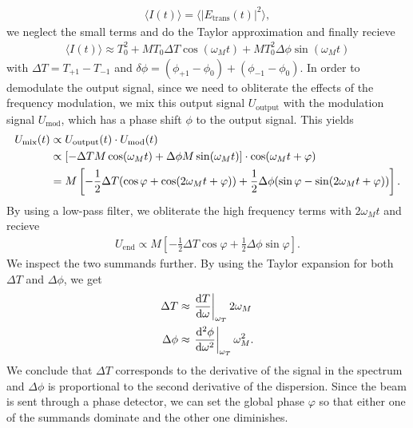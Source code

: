 \begin{align}
\langle I(t)\rangle=\langle|E_\text{trans}(t)|^2\rangle,
\end{align}
we neglect the small terms and do the Taylor approximation and finally recieve
\begin{align}
\langle I(t)\rangle\approx T_0^2+MT_0\Delta T\cos(\omega_M t)+MT_0^2\Delta\phi\sin(\omega_M t)
\end{align}
with $\Delta T=T_{+1}-T_{-1}$ and $\delta\phi=(\phi_{+1}-\phi_0)+(\phi_{-1}-\phi_0)$.
In order to demodulate the output signal, since we need to obliterate the effects of the frequency modulation, we mix this output signal $U_\text{output}$ with the modulation signal $U_\text{mod}$, which has a phase shift $\phi$ to the output signal. This yields
\begin{align}
U_\text{mix}(t)&\propto U_\text{output}(t)\cdot U_\text{mod}(t)\notag\\
&\propto\left[-\Delta TM\cos(\omega_M t)+\Delta \phi M\sin(\omega_M t)\right]\cdot \cos(\omega_M t+\varphi)\notag\\
&=M\left[-\frac{1}{2}\Delta T(\cos\varphi+\cos(2\omega_M t+\varphi))+\frac{1}{2}\Delta\phi(\sin\varphi-\sin(2\omega_M t+\varphi))\right].
\end{align}
By using a low-pass filter, we obliterate the high frequency terms with $2\omega_M t$ and recieve
\begin{align}
U_\text{end}\propto M\left[-\frac{1}{2}\Delta T\cos\varphi+\frac{1}{2}\Delta\phi\sin\varphi\right].
\end{align}
We inspect the two summands further. By using the Taylor expansion for both $\Delta T$ and $\Delta\phi$, we get
\begin{align}
\Delta T&\approx\left.\frac{\mathrm{d} T}{\mathrm{d}\omega}\right|_{\omega_T}2\omega_M\\
\Delta\phi&\approx\left.\frac{\mathrm{d}^2\phi}{\mathrm{d}\omega^2}\right|_{\omega_T}\omega_M^2.
\end{align}
We conclude that $\Delta T$ corresponds to the derivative of the signal in the spectrum and $\Delta \phi$ is proportional to the second derivative of the dispersion. Since the beam is sent through a phase detector, we can set the global phase $\varphi$ so that either one of the summands dominate and the other one diminishes.
